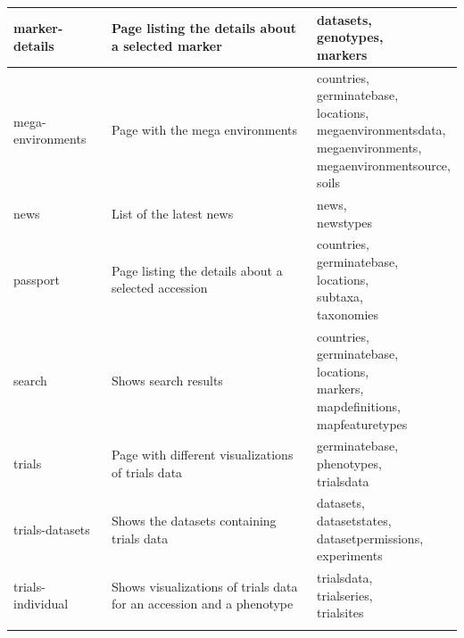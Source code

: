 \begin{longtable}{p{}p{}p{}}
	marker-details          & Page listing the details about a selected marker & \cellwrap{datasets,\\genotypes,\\markers} \\ \midrule
	mega-environments       & Page with the mega environments & \cellwrap{countries,\\germinatebase,\\locations,\\megaenvironmentsdata,\\megaenvironments,\\megaenvironmentsource,\\soils}\\ \midrule
	news				   & List of the latest news & \cellwrap{news,\\newstypes} \\ \midrule
	passport			   & Page listing the details about a selected accession & \cellwrap{countries,\\germinatebase,\\locations,\\subtaxa,\\taxonomies} \\ \midrule
	search				   & Shows search results & \cellwrap{countries,\\germinatebase,\\locations,\\markers,\\mapdefinitions,\\mapfeaturetypes} \\ \midrule
	trials                 & Page with different visualizations of trials data & \cellwrap{germinatebase,\\phenotypes,\\trialsdata} \\ \midrule
	trials-datasets         & Shows the datasets containing trials data & \cellwrap{datasets,\\datasetstates,\\datasetpermissions,\\experiments} \\ \midrule
	trials-individual       & Shows visualizations of trials data for an accession and a phenotype & \cellwrap{trialsdata,\\trialseries,\\trialsites} \\ \midrule
	\bottomrule
	\label{tab:pages}
\end{longtable}

